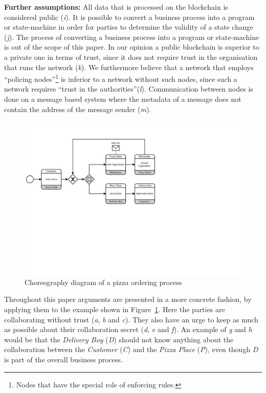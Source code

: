 \documentclass[runningheads]{llncs}
\newcommand{\ber}[1]{\textit{#1}}
\newcommand{\reffig}[1]{Figure~\ref{#1}}
\newcommand{\noteme}[1]{\todo{#1}}
\renewcommand{\bigbreak}{}
\newcommand{\quotel}{``}
\newcommand{\quoter}{''}
\begin{document}
\bigbreak
\textbf{Further assumptions:}
All data that is processed on the blockchain is considered public (\ber{i}). It is possible to convert a business process into a program or state-machine in order for parties to determine the validity of a state change (\ber{j}). The process of converting a business process into a program or state-machine is out of the scope of this paper. In our opinion a public blockchain is superior to a private one in terms of trust, since it does not require trust in the organisation that runs the network (\ber{k}). We furthermore believe that a network that employs \quotel  policing nodes\quoter \footnote{Nodes that have the special role of enforcing rules.} is inferior to a network without such nodes, since such a network requires \quotel trust in the authorities\quoter (\ber{l}). Communication between nodes is done on a message based system where the metadata of a message does not contain the address of the message sender (\ber{m}).

\begin{center}
\begin{figure}
    \centering
    \includegraphics[trim=0cm 9.5cm 11.5cm 2.4cm,clip=true,scale=0.65]{newbpmn.pdf}
    \caption{Choreography diagram of a pizza ordering process} 
    \label{fig:simple_bpmn}
\end{figure}
\end{center}


Throughout this paper arguments are presented in a more concrete fashion, by applying them to the example shown in \reffig{fig:simple_bpmn}. Here the parties are collaborating without trust (\ber{a}, \ber{b} and \ber{c}). They also have an urge to keep as much as possible about their collaboration secret (\ber{d}, \ber{e} and \ber{f}). An example of \ber{g} and \ber{h} would be that the \textit{Delivery Boy} (\ber{D})
 should not know anything about the collaboration between the \textit{Customer} (\ber{C}) and the \textit{Pizza Place} (\ber{P}), even though \ber{D} is part of the overall business process. 
\end{document}
